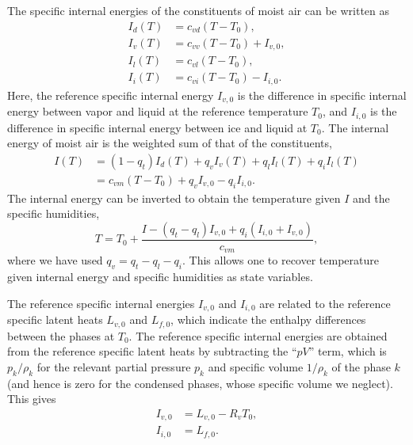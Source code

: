 \documentclass{report}
\begin{document}
The specific internal energies of the constituents of moist air can be written as
\begin{subequations}\label{e:internal_energies}
\begin{align}
I_d(T) & = c_{vd} (T - T_0),  \\
I_v(T) & = c_{vv} (T - T_0) + I_{v,0},\\
I_l(T) & = c_{vl} (T - T_0), \\
I_i(T) & = c_{vi} (T - T_0) - I_{i,0}.
\end{align}
\end{subequations}
Here, the reference specific internal energy $I_{v,0}$ is the difference in specific internal energy between vapor and liquid at the reference temperature $T_0$, and $I_{i,0}$ is the difference in specific internal energy between ice and liquid at $T_0$. The internal energy of moist air is the weighted sum of that of the constituents,
\begin{equation}
\begin{split}
     I(T) & = (1-q_t) I_d(T) + q_v I_v(T) + q_l I_l(T) + q_i I_l(T)\\
          & = c_{vm} (T - T_0)  + q_v I_{v,0} - q_i I_{i,0}.
     \label{eq:total_internal_energy}
\end{split}
\end{equation}
The internal energy can be inverted to obtain the temperature given $I$ and the specific humidities,
\begin{equation}
    T = T_0 + \frac{I - (q_t - q_l) I_{v,0} + q_i (I_{i,0} + I_{v,0})}{c_{vm}},
    \label{eq:temperature}
\end{equation}
where we have used $q_v = q_t - q_l - q_i$. This allows one to recover temperature given internal energy and specific humidities as state variables.

The reference specific internal energies $I_{v,0}$ and $I_{i,0}$ are related to the reference specific latent heats $L_{v,0}$ and $L_{f,0}$, which indicate the enthalpy differences between the phases at $T_0$. The reference specific internal energies are obtained from the reference specific latent heats by subtracting the ``$pV$'' term, which is $p_k/\rho_k$ for the relevant partial pressure $p_k$ and specific volume $1/\rho_k$ of the phase $k$ (and hence is zero for the condensed phases, whose specific volume we neglect). This gives
\begin{subequations}\label{e:ref_internal_energies}
\begin{align}
     I_{v,0} &= L_{v, 0} - R_v T_0,\\
     I_{i,0} &= L_{f, 0}.
\end{align}
\end{subequations}
   
\end{document}
